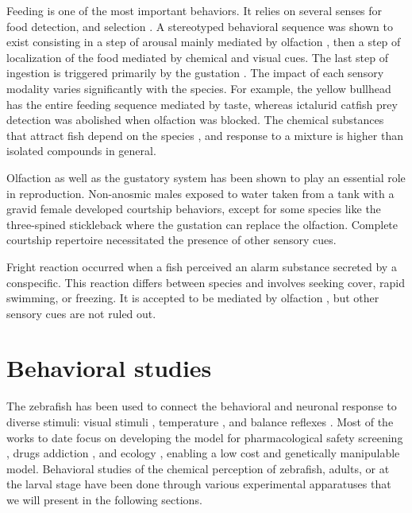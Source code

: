     Feeding is one of the most important behaviors. It relies on several senses for food detection, and selection \cite{pavlov1990sensory}. A stereotyped behavioral sequence was shown to exist \cite{atema1980chemical} consisting in a step of arousal mainly mediated by olfaction \cite{bateson1890sense}, then a step of localization of the food mediated by chemical and visual cues. The last step of ingestion is triggered primarily by the gustation \cite{atema1980chemical}. The impact of each sensory modality varies significantly with the species. For example, the yellow bullhead has the entire feeding sequence mediated by taste, whereas ictalurid catfish prey detection was abolished when olfaction was blocked. The chemical substances that attract fish depend on the species \cite{atema 1982}, and response to a mixture is higher than isolated compounds in general.

    Olfaction \cite{tavolga1956visual} as well as the gustatory system \cite{de1983influence} has been shown to play an essential role in reproduction. Non-anosmic males exposed to water taken from a tank with a gravid female developed courtship behaviors, except for some species like the three-spined stickleback where the gustation can replace the olfaction. Complete courtship repertoire necessitated the presence of other sensory cues.

    Fright reaction occurred when a fish perceived an alarm substance secreted by a conspecific. This reaction differs between species and involves seeking cover, rapid swimming, or freezing. It is accepted to be mediated by olfaction \cite{frisch1942schreckstoff,speedie2008alarm,doving2009alarm}, but other sensory cues are not ruled out.


  \section{Behavioral studies}
  The zebrafish has been used to connect the behavioral and neuronal response to diverse stimuli: visual stimuli \cite{}, temperature \cite{}, and balance reflexes \cite{}. Most of the works to date focus on developing the model for pharmacological safety screening \cite{cassar2019use}, drugs addiction \cite{klee2012zebrafish}, and ecology \cite{dai2014zebrafish}, enabling a low cost and genetically manipulable model. Behavioral studies of the chemical perception of zebrafish, adults, or at the larval stage have been done through various experimental apparatuses that we will present in the following sections.


